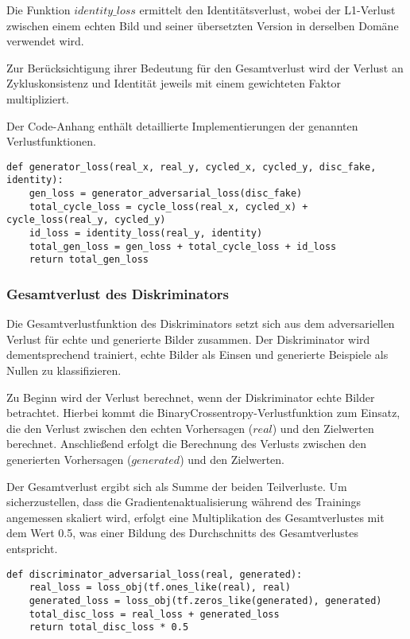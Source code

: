 Die Funktion $identity\_loss$ ermittelt den Identitätsverlust, wobei der L1-Verlust zwischen einem echten Bild und seiner übersetzten Version in derselben Domäne verwendet wird. 

Zur Berücksichtigung ihrer Bedeutung für den Gesamtverlust wird der Verlust an Zykluskonsistenz und Identität jeweils mit einem gewichteten Faktor multipliziert.

Der Code-Anhang enthält detaillierte Implementierungen der genannten Verlustfunktionen.

\begin{lstlisting}[language=pyhaff, caption={Vorverarbeitung des Datensatzes: Jittering}, label={cod:cycleGanGeneratorVerlust}]
def generator_loss(real_x, real_y, cycled_x, cycled_y, disc_fake, identity):
    gen_loss = generator_adversarial_loss(disc_fake)
    total_cycle_loss = cycle_loss(real_x, cycled_x) + cycle_loss(real_y, cycled_y)
    id_loss = identity_loss(real_y, identity)
    total_gen_loss = gen_loss + total_cycle_loss + id_loss
    return total_gen_loss
\end{lstlisting}

\subsubsection{Gesamtverlust des Diskriminators}
Die Gesamtverlustfunktion des Diskriminators setzt sich aus dem adversariellen Verlust für echte und generierte Bilder zusammen. Der Diskriminator wird dementsprechend trainiert, echte Bilder als Einsen und generierte Beispiele als Nullen zu klassifizieren.

Zu Beginn wird der Verlust berechnet, wenn der Diskriminator echte Bilder betrachtet. Hierbei kommt die BinaryCrossentropy-Verlustfunktion zum Einsatz, die den Verlust zwischen den echten Vorhersagen ($real$) und den Zielwerten berechnet. Anschließend erfolgt die Berechnung des Verlusts zwischen den generierten Vorhersagen ($generated$) und den Zielwerten.

Der Gesamtverlust ergibt sich als Summe der beiden Teilverluste. Um sicherzustellen, dass die Gradientenaktualisierung während des Trainings angemessen skaliert wird, erfolgt eine Multiplikation des Gesamtverlustes mit dem Wert 0.5, was einer Bildung des Durchschnitts des Gesamtverlustes entspricht.

\begin{lstlisting}[language=pyhaff, caption={Vorverarbeitung des Datensatzes: Jittering}, label={cod:cycleGanDiscriminatorVerlust}]
def discriminator_adversarial_loss(real, generated):
    real_loss = loss_obj(tf.ones_like(real), real)
    generated_loss = loss_obj(tf.zeros_like(generated), generated)
    total_disc_loss = real_loss + generated_loss
    return total_disc_loss * 0.5
\end{lstlisting}